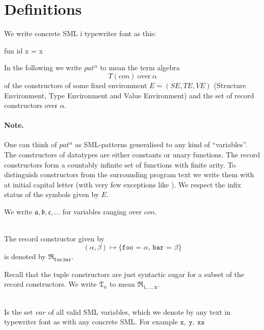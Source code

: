 \section{Definitions}
We write concrete SML i typewriter font as this:
\begin{code}
fun id x = x
\end{code}

\begin{definition}
In the following we write $pat^\alpha$ to mean the term algebra
\[
T(con)\ \text{over}\ \alpha
\]
of the constructors of some fixed environment $E = (S\!E, T\!E, V\!E)$ (Structure
Environment, Type Environment and Value Environment) and the set of record
constructors over $\alpha$. 

\end{definition}

\paragraph{Note.} One can think of $pat^\alpha$ as SML-patterns generalised to
any kind of ``variables''. The constructors of datatypes are either constants or
unary functions. The record constructors form a countably infinite set of
functions with finite arity. To distinguish constructors from the surrounding
program text we write them with at initial capital letter (with very few
exceptions like \codeinline{::} ). We respect the infix status
of the symbols given by $E$.

We write $\mathfrak{a}, \mathfrak{b}, \mathfrak{c}, \ldots$ for variables ranging
over $con$.

\begin{definition} \ \\
  The record constructor given by
  \[
  (\alpha, \beta) \mapsto \texttt{\{foo = $\alpha$, bar = $\beta$\}}
  \]
  is denoted by $\mathfrak{R}_{\texttt{foo},\texttt{bar}}$.

  Recall that the tuple constructors are just syntactic sugar for a subset of
  the record constructors. We write $\mathfrak{T}_n$ to mean
  $\mathfrak{R}_{\texttt{1},\ldots,\texttt{n}}$.
\end{definition}

\begin{definition} \ \\
  Is the set $var$ of all valid SML variables, which we denote by any text in
  typewriter font as with any concrete SML. For example $\mathtt{x},\
  \mathtt{y},\ \mathtt{xs}$
\end{definition}


